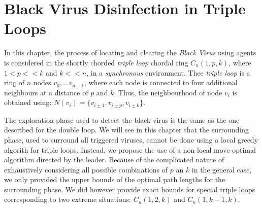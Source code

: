 


\chapter {Black Virus Disinfection in Triple Loops}
\label{TL}
 


In this chapter, the process of locating and clearing the {\it Black Virus} using agents is considered in the shortly chorded {\it triple loop} chordal ring $C_n(1,p,k)$, where $1<p<<k$ and $k <<n$,  in a {\it synchronous} environment.  Thee {\it triple loop}   is a    ring of $n$ nodes $v_0, \ldots v_{n-1}$, where each node is connected to four additional neighbours at a distance of $p$ and $k$. Thus, the neighbourhood of node $v_i$ is obtained using: $N(v_{i})=\{v_{i\pm1},v_{i\pm p},v_{i\pm k}\}$.

The exploration phase used to detect the black virus is the same as the one described for the double loop. We will see in this chapter that the surrounding phase, used to surround all triggered viruses, cannot be done using a local greedy algorith for triple loops. Instead, we propose the use of a non-local move-optimal algorithm directed by the leader. 
Because of the complicated nature of exhaustively considering all possible combinations of  $p$ an $k$ in the general case, we only provided the upper bounds of the optimal path lengths for the surrounding phase. We did however provide exact bounds for   special  triple loops  corresponding to two   extreme situations: $C_n(1,2,k)$   and $C_n(1,k-1,k)$.   

 



  
 


